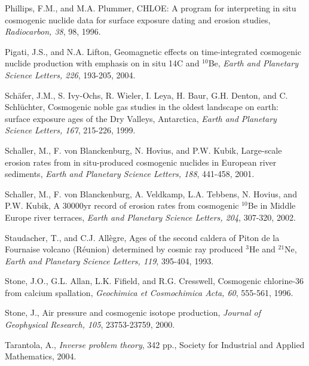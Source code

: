 \documentclass{article}
\begin{document}
\begin{description}
\item  Phillips,  F.M.,  and   M.A.  Plummer,  CHLOE:  A  program  for
  interpreting in  situ cosmogenic  nuclide data for  surface exposure
  dating and erosion studies, {\it Radiocarbon, 38}, 98, 1996.
  
\item  Pigati,   J.S.,  and  N.A.   Lifton,   Geomagnetic  effects  on
  time-integrated  cosmogenic nuclide production  with emphasis  on in
  situ 14C and  $^{10}$Be, {\it Earth and Planetary  Science Letters, 226},
  193-205, 2004.

\item Sch\"{a}fer,  J.M., S. Ivy-Ochs,  R. Wieler, I. Leya,  H.  Baur,
  G.H.  Denton,  and C.  Schl\"{u}chter, Cosmogenic  noble gas studies
  in the oldest  landscape on earth: surface exposure  ages of the Dry
  Valleys, Antarctica, {\it Earth and Planetary Science Letters, 167},
  215-226, 1999.
  
\item Schaller, M., F. von  Blanckenburg, N.  Hovius, and P.W.  Kubik,
  Large-scale erosion rates  from in situ-produced cosmogenic nuclides
  in  European  river  sediments,  {\it Earth  and  Planetary  Science
    Letters, 188}, 441-458, 2001.
  
\item Schaller, M., F. von Blanckenburg, A. Veldkamp, L.A. Tebbens, N.
  Hovius,  and P.W.   Kubik, A  30000yr record  of erosion  rates from
  cosmogenic  $^{10}$Be in  Middle Europe  river terraces,  {\it  Earth and
    Planetary Science Letters, 204}, 307-320, 2002.
  
\item  Staudacher,  T., and  C.J.   All\`{e}gre,  Ages  of the  second
  caldera of Piton de la Fournaise volcano (R\'{e}union) determined by
  cosmic ray  produced $^3$He and $^{21}$Ne, {\it  Earth and Planetary
    Science Letters, 119}, 395-404, 1993.
  
\item Stone,  J.O., G.L.  Allan,  L.K.  Fifield, and  R.G.  Cresswell,
  Cosmogenic chlorine-36  from calcium spallation,  {\it Geochimica et
    Cosmochimica Acta, 60}, 555-561, 1996.

\item Stone, J., Air pressure  and cosmogenic isotope production, 
  {\it Journal of Geophysical Research, 105}, 23753-23759, 2000.
  
\item Tarantola,  A., {\it Inverse  problem theory}, 342  pp., Society
  for Industrial and Applied Mathematics, 2004.

\end{description}
\end{document}
